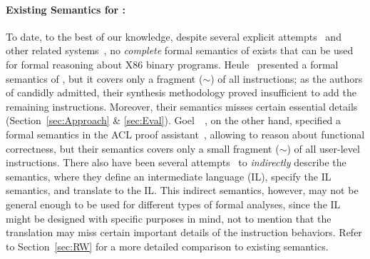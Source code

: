 \paragraph{Existing Semantics for \ISA:}
%
To date, to the best of our knowledge, despite several explicit attempts~\cite{Heule2016a,Goel:FMCAD14,Goel:ProCoS17,Goel:VTTE13:ACP:2958657.2958669} and other related systems~\cite{Leroy:2009,Remill,TSL:TOPLAS13,Hasabnis:ASPLOS16,Hasabnis:FSE16},
no \emph{complete} formal semantics of \ISA exists that can be used for formal reasoning about X86 binary programs.
%
Heule~\etal \cite{Heule2016a} presented a formal semantics of \ISA, but it covers only a fragment ($\sim$\strataPerc{}) of all instructions; as the authors of \cite{Heule2016a} candidly admitted, their synthesis methodology proved insufficient to add the remaining instructions. 
%
Moreover, their semantics misses certain essential details (Section~\ref{sec:Approach} \& \ref{sec:Eval}).
%
%
Goel~\etal~\cite{Goel:FMCAD14,Goel:ProCoS17,Goel:VTTE13:ACP:2958657.2958669}, on the other hand, specified a formal semantics in the ACL proof assistant~\cite{ACL2:Kaufmann2000}, allowing to reason about functional correctness, but their semantics covers only a small fragment ($\sim$\goelPerc{}) of all user-level instructions.
%
There also have been several attempts~\cite{Angr1,BAP:CAV11,Radare2,Hasabnis:FSE16} to \emph{indirectly} describe the \ISA semantics, where they define an intermediate language (IL), specify the IL semantics, and translate \ISA to the IL.
This indirect semantics, however, may not be general enough to be used for different types of formal analyses, since the IL might be designed with specific purposes in mind, not to mention that the translation may miss certain important details of the instruction behaviors.
%
Refer to Section~\ref{sec:RW} for a more detailed comparison to existing semantics.


